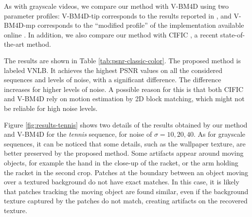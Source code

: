 \documentclass[10pt, journal, twocolumn, final, a4paper]{IEEEtran}
\begin{document}
As with grayscale videos, we compare our method with V-BM4D using two parameter profiles:
V-BM4D-tip corresponds to the results reported in \cite{Maggioni2012}, and
V-BM4D-mp corresponds to the ``modified profile''
of the implementation available online \cite{bm4dcode}.
In addition, we also compare our method with CIFIC \cite{Dai2013}, a recent
state-of-the-art method.

The results are shown in Table \ref{tab:psnr-classic-color}. The proposed method is
labeled VNLB. It achieves the highest PSNR values on all the considered
sequences and levels of noise, with a significant difference. The difference
increases for higher levels of noise. A possible reason for this is that both 
CIFIC and V-BM4D rely on motion estimation by 2D block matching, which might
not be reliable for high noise levels.


Figure \ref{fig:results-tennis} 
shows two details of the results obtained by our method and V-BM4D for the
\emph{tennis} sequence, for noise of $\sigma = 10, 20, 40$. As for grayscale
sequences, it can be noticed that some details, such as the wallpaper texture,
are better preserved by the proposed method. Some artifacts appear around 
moving objects, for example the hand in the close-up of the racket,
or the arm holding the racket in the second crop.
%
Patches at the boundary between an object moving over a textured background 
do not have exact matches. In this case, it is likely that patches tracking 
the moving object are found similar, even if the background texture captured by 
the patches do not match, creating artifacts on the recovered texture.

%
%
%
\end{document}
